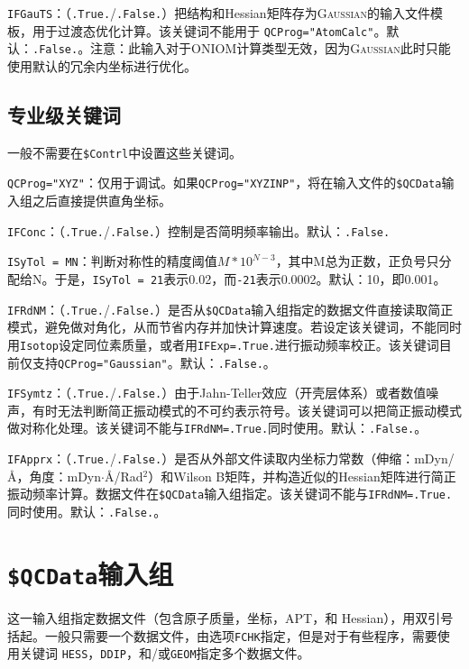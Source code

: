 \documentclass[12pt,a4paper,openany,twoside,cap,UTF8]{ctexbook}
\begin{document}
\bigskip{}\noindent
\verb|IFGauTS|：（\verb|.True.|/\verb|.False.|）把结构和Hessian矩阵存为\textsc{Gaussian}的输入文件模板，用于过渡态优化计算。该关键词不能用于
\verb|QCProg="AtomCalc"|。默认：\verb|.False.|。注意：此输入对于ONIOM计算类型无效，因为\textsc{Gaussian}此时只能使用默认的冗余内坐标进行优化。

\subsection{专业级关键词} \label{subsec:inp-qcdata-expert}

一般不需要在\texttt{\$Contrl}中设置这些关键词。

\bigskip{}\noindent
\verb|QCProg="XYZ"|：仅用于调试。如果\verb|QCProg="XYZINP"|，将在输入文件的\texttt{\$QCData}输入组之后直接提供直角坐标。

\bigskip{}\noindent
\verb|IFConc|：（\verb|.True.|/\verb|.False.|）控制是否简明频率输出。默认：\verb|.False.|

\bigskip{}\noindent
\verb|ISyTol = MN|：判断对称性的精度阈值$M*10^{N-3}$，其中M总为正数，正负号只分配给N。于是，\verb|ISyTol = 21|表示0.02，而\verb|-21|表示0.0002。默认：10，即0.001。

\bigskip{}\noindent
\verb|IFRdNM|：（\verb|.True.|/\verb|.False.|）是否从\texttt{\$QCData}输入组指定的数据文件直接读取简正模式，避免做对角化，从而节省内存并加快计算速度。若设定该关键词，不能同时用\verb|Isotop|设定同位素质量，或者用\verb|IFExp=.True.|进行振动频率校正。该关键词目前仅支持\verb|QCProg="Gaussian"|。默认：\verb|.False.|。

\bigskip{}\noindent
\verb|IFSymtz|：（\verb|.True.|/\verb|.False.|）由于Jahn-Teller效应（开壳层体系）或者数值噪声，有时无法判断简正振动模式的不可约表示符号。该关键词可以把简正振动模式做对称化处理。该关键词不能与\verb|IFRdNM=.True.|同时使用。默认：\verb|.False.|。

\bigskip{}\noindent
\verb|IFApprx|：（\verb|.True.|/\verb|.False.|）是否从外部文件读取内坐标力常数（伸缩：mDyn/\AA，角度：mDyn$\cdot$\AA/Rad$^2$）和Wilson B矩阵，并构造近似的Hessian矩阵进行简正振动频率计算。数据文件在\texttt{\$QCData}输入组指定。该关键词不能与\verb|IFRdNM=.True.|同时使用。默认：\verb|.False.|。


\section{\texttt{\$QCData}输入组} \label{sec:inp-qcdata}

这一输入组指定数据文件（包含原子质量，坐标，APT，和 Hessian），用双引号括起。一般只需要一个数据文件，由选项\verb|FCHK|指定，但是对于有些程序，需要使用关键词
\verb|HESS|，\verb|DDIP|，和/或\verb|GEOM|指定多个数据文件。
\end{document}
